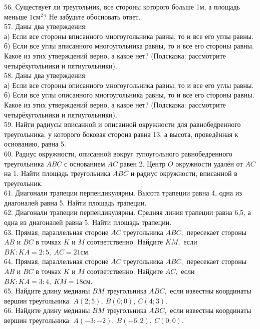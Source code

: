 \documentclass[12pt]{article}
\begin{document}
56. Существует ли треугольник, все стороны которого больше 1м, а площадь меньше $1\text{см}^2?$ Не забудьте обосновать ответ.\\
57. Даны два утверждения:\\
а) Если все стороны вписанного многоугольника равны, то и все его углы равны.\\
б) Если все углы вписанного многоугольника равны, то и все его стороны равны.\\
Какое из этих утверждений верно, а какое нет? (Подсказка: рассмотрите четырёхугольники и пятиугольники).\\
58. Даны два утверждения:\\
а) Если все стороны описанного многоугольника равны, то и все его углы равны.\\
б) Если все углы описанного многоугольника равны, то и все его стороны равны.\\
Какое из этих утверждений верно, а какое нет? (Подсказка: рассмотрите четырёхугольники и пятиугольники).\\
59. Найти радиусы вписанной и описанной окружности для равнобедренного треугольника, у которого боковая сторона равна 13, а высота, проведённая к основанию, равна 5.\\
60. Радиус окружности, описанной вокруг тупоугольного равнобедренного треугольника $ABC$ с основанием $AC$ равен 2. Центр $O$ окружности удалён от $AC$ на 1. Найти площадь треугольника $ABC$ и радиус окружности, вписанной в треугольник.\\
61. Диагонали трапеции перпендикулярны. Высота трапеции равна 4, одна из диагоналей равна 5. Найти площадь трапеции.\\
62. Диагонали трапеции перпендикулярны. Средняя линия трапеции равна 6,5, а одна из диагоналей равна 5. Найти площадь трапеции.\\
63. Прямая, параллельная стороне $AC$ треугольника $ABC,$ пересекает стороны $AB$ и $BC$ в точках $K$ и $M$ соответственно. Найдите $KM,$ если $BK:KA=2:5,\ AC=21$см.\\
64. Прямая, параллельная стороне $AC$ треугольника $ABC,$ пересекает стороны $AB$ и $BC$ в точках $K$ и $M$ соответственно. Найдите $AC,$ если $BK:KA=3:4,\ KM=18$см.\\
65. Найдите длину медианы $BM$ треугольника $ABC,$ если известны координаты вершин треугольника: $A(2;5),\ B(0;0),\ C(4;3).$\\
66. Найдите длину медианы $BM$ треугольника $ABC,$ если известны координаты вершин треугольника: $A(-3;-2),\ B(-6;2),\ C(0;0).$\\
\end{document}
